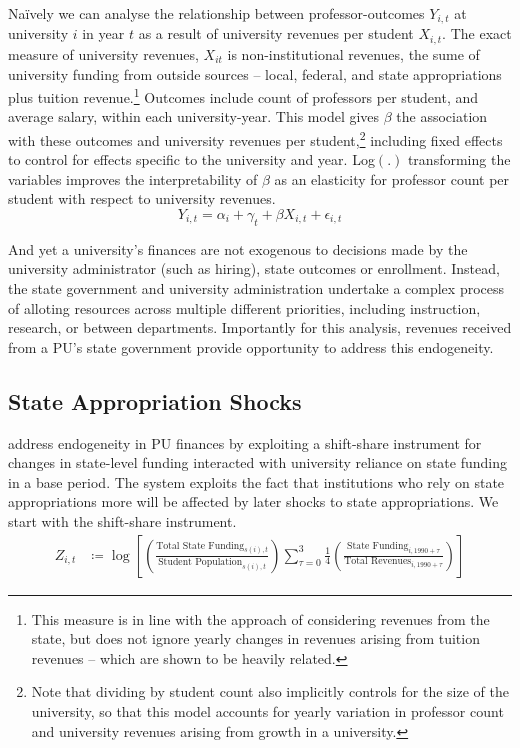 \documentclass[notitlepage,12pt]{article}
\begin{document}
Na\"ively we can analyse the relationship between professor-outcomes $Y_{i,t}$ at university $i$ in year $t$ as a result of university revenues per student $X_{i,t}$.
The exact measure of university revenues, $X_{it}$ is non-institutional revenues, the sume of university funding from outside sources -- local, federal, and state appropriations plus tuition revenue.\footnote{
    This measure is in line with the \cite{NBERw27885} approach of considering revenues from the state, but does not ignore yearly changes in revenues arising from tuition revenues -- which are shown to be heavily related.
}
Outcomes include count of professors per student, and average salary, within each university-year.
This model gives $\beta$ the association with these outcomes and university revenues per student,\footnote{
    Note that dividing by student count also implicitly controls for the size of the university, so that this model accounts for yearly variation in professor count and university revenues arising from growth in a university.
}
including fixed effects to control for effects specific to the university and year.
Log$(.)$ transforming the variables improves the interpretability of $\beta$ as an elasticity for professor count per student with respect to university revenues.
\begin{equation}
    \label{eqn:naivereg}
    Y_{i,t} = \alpha_i + \gamma_t + \beta X_{i,t} + \epsilon_{i,t}
\end{equation}

And yet a university's finances are not exogenous to decisions made by the university administrator (such as hiring), state outcomes or enrollment.
Instead, the state government and university administration undertake a complex process of alloting resources across multiple different priorities, including instruction, research, or between departments.
Importantly for this analysis, revenues received from a  PU's state government provide opportunity to address this endogeneity.


\subsection{State Appropriation Shocks}
\label{sec:approp-shocks}

\cite{NBERw23736,chakrabarti2018effect,NBERw27885} address endogeneity in PU finances by exploiting a shift-share instrument for changes in state-level funding interacted with university reliance on state funding in a base period.
The system exploits the fact that institutions who rely on state appropriations more will be affected by later shocks to state appropriations.
We start with the shift-share instrument.
\begin{align}
    \label{eqn:public-instrument}
    Z_{i,t} &\coloneqq \log \left[
    \left( \frac{\text{Total State Funding}_{s(i),t}}{\text{Student Population}_{s(i),t}} \right)
    \sum_{\tau = 0}^{3} \frac 14
    \left( \frac{\text{State Funding}_{i,1990 + \tau}}{\text{Total Revenues}_{i,1990 + \tau}} \right) \right]
\end{align}
\end{document}
